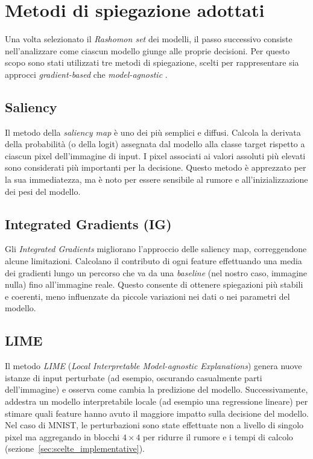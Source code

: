 \documentclass[12pt,a4paper,oneside]{report}
\numberwithin{figure}{chapter}
\numberwithin{table}{chapter}
\begin{document}
\chapter{Metodi di spiegazione adottati}

Una volta selezionato il \emph{Rashomon set} dei modelli, il passo successivo
consiste nell’analizzare come ciascun modello giunge alle proprie decisioni.
Per questo scopo sono stati utilizzati tre metodi di spiegazione, scelti per
rappresentare sia approcci \emph{gradient-based} che \emph{model-agnostic}
\cite{adadi2018survey,guidotti2018survey}.

\section{Saliency}
Il metodo della \emph{saliency map} \cite{simonyan2013deep,samek2016evaluating}
è uno dei più semplici e diffusi. Calcola la derivata della probabilità (o
della logit) assegnata dal modello alla classe target rispetto a ciascun pixel
dell’immagine di input. I pixel associati ai valori assoluti più elevati sono
considerati più importanti per la decisione. Questo metodo è apprezzato per la
sua immediatezza, ma è noto per essere sensibile al rumore e
all’inizializzazione dei pesi del modello.

\section{Integrated Gradients (IG)}
Gli \emph{Integrated Gradients} \cite{sundararajan2017axiomatic} migliorano
l’approccio delle saliency map, correggendone alcune limitazioni. Calcolano il
contributo di ogni feature effettuando una media dei gradienti lungo un
percorso che va da una \emph{baseline} (nel nostro caso, immagine nulla) fino
all’immagine reale. Questo consente di ottenere spiegazioni più stabili e
coerenti, meno influenzate da piccole variazioni nei dati o nei parametri del
modello.

\section{LIME}
Il metodo \emph{LIME} (\emph{Local Interpretable Model-agnostic Explanations})
\cite{ribeiro2016lime} genera nuove istanze di input perturbate (ad esempio,
oscurando casualmente parti dell’immagine) e osserva come cambia la predizione
del modello. Successivamente, addestra un modello interpretabile locale (ad
esempio una regressione lineare) per stimare quali feature hanno avuto il
maggiore impatto sulla decisione del modello. Nel caso di MNIST, le
perturbazioni sono state effettuate non a livello di singolo pixel ma
aggregando in blocchi $4\times4$ per ridurre il rumore e i tempi di calcolo
(sezione~\ref{sec:scelte_implementative}).
\end{document}

